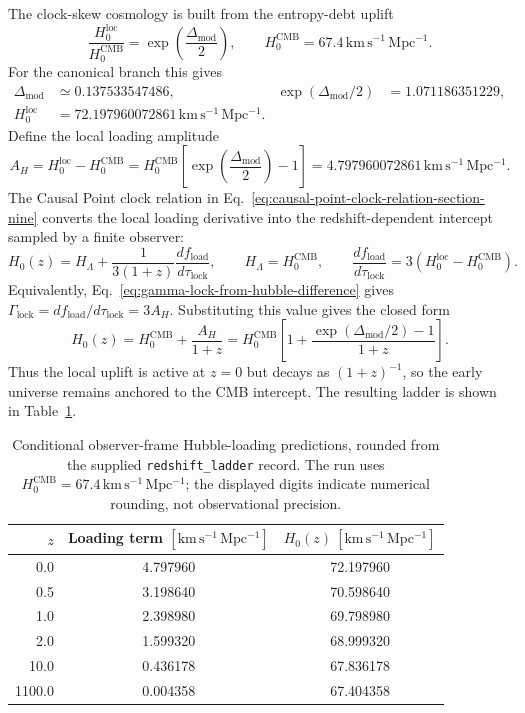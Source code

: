 \documentclass[11pt,letterpaper]{article}
\theoremstyle{plain}
\DeclareRobustCommand{\pyvar}[1]{%
  \ifmmode\text{\nolinkurl{#1}}\else\nolinkurl{#1}\fi%
}
\newcommand{\hcmb}{H_0^{\text{CMB}}}
\newcommand{\hloc}{H_0^{\text{loc}}}
\newcommand{\kmsmpc}{\mathrm{km\,s^{-1}\,Mpc^{-1}}}
\newcommand{\DeltaMod}{\Delta_{\text{mod}}}
\newcommand{\fload}{f_{\text{load}}}
\newcommand{\GammaLock}{\Gamma_{\text{lock}}}
\newcommand{\AH}{A_H}
\begin{document}
The clock-skew cosmology is built from the entropy-debt uplift
\begin{equation}
\label{eq:entropy-debt-uplift}
 \frac{\hloc}{\hcmb}
 =
 \exp\!\left(\frac{\DeltaMod}{2}\right),
 \qquad
 \hcmb=67.4\,\kmsmpc.
\end{equation}
For the canonical branch this gives
\begin{align}
\label{eq:local-hubble-uplift}
 \DeltaMod&\simeq0.137533547486,
 &
 \exp(\DeltaMod/2)&=1.071186351229,\\
 \hloc&=72.197960072861\,\kmsmpc.
\end{align}
Define the local loading amplitude
\begin{equation}
\label{eq:hubble-loading-amplitude}
 \AH
 =
 \hloc-\hcmb
 =
 \hcmb\!\left[\exp\!\left(\frac{\DeltaMod}{2}\right)-1\right]
 =
 4.797960072861\,\kmsmpc .
\end{equation}
The Causal Point clock relation in
Eq.~\eqref{eq:causal-point-clock-relation-section-nine} converts the local
loading derivative into the redshift-dependent intercept sampled by a finite
observer:
\begin{equation}
\label{eq:precision-loading-law}
 H_0(z)
 =
 H_{\Lambda}
 +
 \frac{1}{3(1+z)}
 \frac{d\fload}{d\tau_{\text{lock}}},
 \qquad
 H_{\Lambda}=\hcmb,
 \qquad
 \frac{d\fload}{d\tau_{\text{lock}}}
 =
 3(\hloc-\hcmb).
\end{equation}
Equivalently, Eq.~\eqref{eq:gamma-lock-from-hubble-difference} gives
\(\GammaLock=d\fload/d\tau_{\text{lock}}=3\AH\).  Substituting this value
gives the closed form
\begin{equation}
\label{eq:derived-hubble-loading-law}
 \boxed{
 H_0(z)
 =
 \hcmb+\frac{\AH}{1+z}
 =
 \hcmb\left[
 1+\frac{\exp(\DeltaMod/2)-1}{1+z}
 \right].
 }
\end{equation}
Thus the local uplift is active at \(z=0\) but decays as \((1+z)^{-1}\), so the
early universe remains anchored to the CMB intercept.  The resulting ladder is shown in
Table~\ref{tab:precision-redshift-ladder}.

\begin{table}[htbp]
\centering
\small
\begin{tabular}{@{}rcc@{}}
\toprule
\(z\) & Loading term \([\kmsmpc]\) & \(H_0(z)\ [\kmsmpc]\) \\
\midrule
0.0 & 4.797960 & 72.197960 \\
0.5 & 3.198640 & 70.598640 \\
1.0 & 2.398980 & 69.798980 \\
2.0 & 1.599320 & 68.999320 \\
10.0 & 0.436178 & 67.836178 \\
1100.0 & 0.004358 & 67.404358 \\
\bottomrule
\end{tabular}
\caption{Conditional observer-frame Hubble-loading predictions, rounded from
the supplied \pyvar{redshift_ladder} record.  The run uses
\(\hcmb=67.4\,\kmsmpc\); the displayed digits indicate numerical rounding,
not observational precision.}
\label{tab:precision-redshift-ladder}
\end{table}
\end{document}
